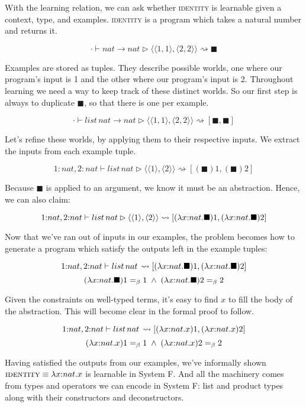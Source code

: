 With the learning relation, we can ask whether \textsc{identity} is learnable given a context, type, and examples. \textsc{identity} is a program which takes a natural number and returns it. \vspace{-1.0em}
\begin{singlespace}
$$\cdot \vdash nat \!\to\! nat \rhd \langle\langle1,1\rangle,\langle2,2\rangle\rangle \rightsquigarrow \blacksquare$$
\end{singlespace}
Examples are stored as tuples. They describe possible worlds, one where our program's input is 1 and the other where our program's input is 2. Throughout learning we need a way to keep track of these distinct worlds. So our first step is always to duplicate $\blacksquare$, so that there is one per example. \vspace{-1.0em}
\begin{singlespace}
$$\cdot \vdash list \,nat \!\to\! nat \rhd \langle\langle1,1\rangle,\langle2,2\rangle\rangle \rightsquigarrow [\blacksquare, \blacksquare]$$
\end{singlespace}
Let's refine these worlds, by applying them to their respective inputs. We extract the inputs from each example tuple.\vspace{-1.0em}
\begin{singlespace}
$$1{:}nat, 2{:}nat \vdash list \,nat \rhd \langle\langle1\rangle,\langle2\rangle\rangle \rightsquigarrow [(\blacksquare)1, (\blacksquare)2]$$
\end{singlespace}
Because $\blacksquare$ is applied to an argument, we know it must be an abstraction. Hence, we can also claim: \vspace{-1.0em}
\begin{singlespace}
$$1{:}nat, 2{:}nat \vdash list \,nat \rhd \langle\langle1\rangle,\langle2\rangle\rangle \rightsquigarrow [(\lambda x{:}nat.\blacksquare)1, (\lambda x{:}nat.\blacksquare)2]$$
\end{singlespace}
Now that we've ran out of inputs in our examples, the problem becomes how to generate a program which satisfy the outputs left in the example tuples:\vspace{-1.0em}
\begin{singlespace}
$$1{:}nat, 2{:}nat \vdash list \,nat\, \rightsquigarrow [(\lambda x{:}nat.\blacksquare)1, (\lambda x{:}nat.\blacksquare)2]$$
$$(\lambda x{:}nat.\blacksquare)1 =_\beta 1\;\land\;(\lambda x{:}nat.\blacksquare)2=_\beta2$$
\end{singlespace}
Given the constraints on well-typed terms, it's easy to find $x$ to fill the body of the abstraction. This will become clear in the formal proof to follow. \vspace{-1.0em}
\begin{singlespace}
$$1{:}nat, 2{:}nat \vdash list \,nat\, \rightsquigarrow [(\lambda x{:}nat.x)1, (\lambda x{:}nat.x)2]$$
$$(\lambda x{:}nat.x)1 =_\beta 1\;\land\;(\lambda x{:}nat.x)2=_\beta2$$
\end{singlespace}
Having satisfied the outputs from our examples, we've informally shown $\textsc{identity} \equiv \lambda x{:}nat.x$ is learnable in System F. And all the machinery comes from types and operators we can encode in System F: list and product types along with their constructors and deconstructors.

